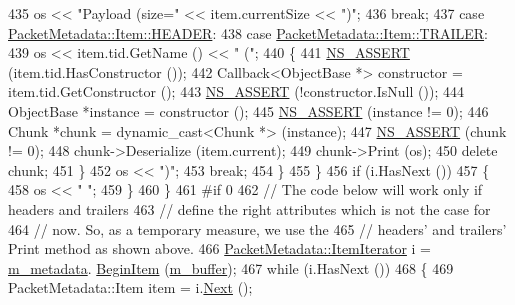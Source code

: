 \begin{DoxyCode}
435               os << \textcolor{stringliteral}{"Payload (size="} << item.currentSize << \textcolor{stringliteral}{")"};
436               \textcolor{keywordflow}{break};
437             \textcolor{keywordflow}{case} \hyperlink{structns3_1_1PacketMetadata_1_1Item_ab0a06781a8793079afeab58a9a9b3174a35a76b7dc57ca42587ecfb5f81f1bcb2}{PacketMetadata::Item::HEADER}:
438             \textcolor{keywordflow}{case} \hyperlink{structns3_1_1PacketMetadata_1_1Item_ab0a06781a8793079afeab58a9a9b3174ab32282a2f84adad5e57549c03179ff45}{PacketMetadata::Item::TRAILER}:
439               os << item.tid.GetName () << \textcolor{stringliteral}{" ("};
440               \{
441                 \hyperlink{assert_8h_a6dccdb0de9b252f60088ce281c49d052}{NS\_ASSERT} (item.tid.HasConstructor ());
442                 Callback<ObjectBase *> constructor = item.tid.GetConstructor ();
443                 \hyperlink{assert_8h_a6dccdb0de9b252f60088ce281c49d052}{NS\_ASSERT} (!constructor.IsNull ());
444                 ObjectBase *instance = constructor ();
445                 \hyperlink{assert_8h_a6dccdb0de9b252f60088ce281c49d052}{NS\_ASSERT} (instance != 0);
446                 Chunk *chunk = \textcolor{keyword}{dynamic\_cast<}Chunk *\textcolor{keyword}{>} (instance);
447                 \hyperlink{assert_8h_a6dccdb0de9b252f60088ce281c49d052}{NS\_ASSERT} (chunk != 0);
448                 chunk->Deserialize (item.current);
449                 chunk->Print (os);
450                 \textcolor{keyword}{delete} chunk;
451               \}
452               os << \textcolor{stringliteral}{")"};
453               \textcolor{keywordflow}{break};
454             \}
455         \}
456       \textcolor{keywordflow}{if} (i.HasNext ())
457         \{
458           os << \textcolor{stringliteral}{" "};
459         \}
460     \}
461 \textcolor{preprocessor}{#if 0}
462   \textcolor{comment}{// The code below will work only if headers and trailers}
463   \textcolor{comment}{// define the right attributes which is not the case for}
464   \textcolor{comment}{// now. So, as a temporary measure, we use the }
465   \textcolor{comment}{// headers' and trailers' Print method as shown above.}
466   \hyperlink{classns3_1_1PacketMetadata_a32606143b9dd3fe0db01264200e27783}{PacketMetadata::ItemIterator} i = \hyperlink{classns3_1_1Packet_af3f95fba7966191bd152bcedd5fbcd6b}{m\_metadata}.
      \hyperlink{classns3_1_1PacketMetadata_aa574c0500da92d42d3cb53ae8a9fd0ad}{BeginItem} (\hyperlink{classns3_1_1Packet_a0f17bc9b4177865c9fe48fc927d57996}{m\_buffer});
467   \textcolor{keywordflow}{while} (i.HasNext ())
468     \{
469       PacketMetadata::Item item = i.\hyperlink{classns3_1_1PacketMetadata_1_1ItemIterator_a3d59a1673dca4338f41d3c788ccd3e10}{Next} ();

\end{DoxyCode}
